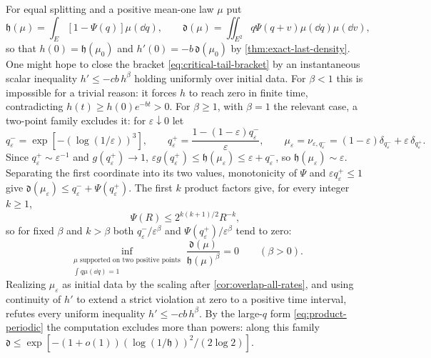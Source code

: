 \begin{remark}
\label{rem:scalar-obstruction}
For equal splitting and a positive mean-one law $\mu$ put
\[
 \mathfrak h(\mu)=\int_E[1-\Psi(q)]\mu(\dd q),\qquad
 \mathfrak d(\mu)=\iint_{E^2}q\Psi(q+v)\mu(\dd q)\mu(\dd v),
\]
so that $h(0)=\mathfrak h(\mu_0)$ and $h'(0)=-b\,\mathfrak d(\mu_0)$
by \cref{thm:exact-last-density}. One might hope to close the bracket
\eqref{eq:critical-tail-bracket} by an instantaneous scalar inequality
$h'\leq-cb\,h^\beta$ holding uniformly over initial data. For
$\beta<1$ this is impossible for a trivial reason: it forces $h$ to
reach zero in finite time, contradicting $h(t)\geq h(0)e^{-bt}>0$. For
$\beta\geq1$, with $\beta=1$ the relevant case, a two-point family
excludes it: for $\varepsilon\downarrow0$ let
\begin{equation}
 q^-_\varepsilon=\exp[-(\log(1/\varepsilon))^3],\qquad
 q^+_\varepsilon=\frac{1-(1-\varepsilon)q^-_\varepsilon}\varepsilon,
 \qquad
 \mu_\varepsilon=\nu_{\varepsilon,q^-_\varepsilon}
 =(1-\varepsilon)\delta_{q^-_\varepsilon}
   +\varepsilon\,\delta_{q^+_\varepsilon}.
 \label{eq:two-point-counterexample}
\end{equation}
Since $q^+_\varepsilon\sim\varepsilon^{-1}$ and
$g(q^+_\varepsilon)\to1$,
$\varepsilon g(q^+_\varepsilon)\leq\mathfrak h(\mu_\varepsilon)
\leq\varepsilon+q^-_\varepsilon$, so
$\mathfrak h(\mu_\varepsilon)\sim\varepsilon$. Separating the first
coordinate into its two values, monotonicity of $\Psi$ and
$\varepsilon q^+_\varepsilon\leq1$ give
$\mathfrak d(\mu_\varepsilon)\leq q^-_\varepsilon
+\Psi(q^+_\varepsilon)$. The first $k$ product factors give, for every
integer $k\geq1$,
\begin{equation}
 \Psi(R)\leq 2^{k(k+1)/2}R^{-k},
 \label{eq:product-superpower}
\end{equation}
so for fixed $\beta$ and $k>\beta$ both
$q^-_\varepsilon/\varepsilon^\beta$ and
$\Psi(q^+_\varepsilon)/\varepsilon^\beta$ tend to zero:
\begin{equation}
 \inf_{\substack{\mu\text{ supported on two positive points}\\
                  \int q\mu(\dd q)=1}}
      \frac{\mathfrak d(\mu)}{\mathfrak h(\mu)^\beta}=0
 \qquad(\beta>0).
 \label{eq:scalar-obstruction}
\end{equation}
Realizing $\mu_\varepsilon$ as initial data by the scaling after
\cref{cor:overlap-all-rates}, and using continuity of $h'$ to extend a
strict violation at zero to a positive time interval, refutes every
uniform inequality $h'\leq-cb\,h^\beta$. By the large-$q$ form
\eqref{eq:product-periodic} the computation excludes more than powers:
along this family
$\mathfrak d\leq\exp[-(1+o(1))(\log(1/\mathfrak h))^2/(2\log2)]$.


\end{remark}
